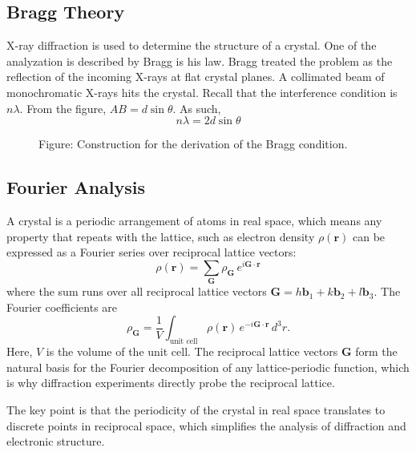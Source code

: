 \documentclass[../../../main.tex]{subfiles}
\begin{document}
\subsection{Bragg Theory}
X-ray diffraction is used to determine the structure of a crystal.
One of the analyzation is described by Bragg is his law.
Bragg treated the problem as the reflection of the incoming X-rays at flat crystal planes.
A collimated beam of monochromatic X-rays hits the crystal.
Recall that the interference condition is $n\lambda$. From the figure, $AB=d\sin \theta$.
As such,
\begin{equation*}
    n\lambda=2d\sin\theta
\end{equation*}
\begin{figure}[]
    \centering
    \caption*{Figure: Construction for the derivation of the Bragg condition.}
\end{figure}

\subsection{Fourier Analysis}
A crystal is a periodic arrangement of atoms in real space, which means any property that repeats with the lattice, such as electron density $\rho(\mathbf{r})$ can be expressed as a Fourier series over reciprocal lattice vectors:
\begin{equation*}
    \rho(\mathbf{r}) = \sum_{\mathbf{G}} \rho_{\mathbf{G}} \, e^{i \mathbf{G} \cdot \mathbf{r}}
\end{equation*}
where the sum runs over all reciprocal lattice vectors $\mathbf{G} = h \mathbf{b}_1 + k \mathbf{b}_2 + l \mathbf{b}_3$.
The Fourier coefficients are
\begin{equation*}
    \rho_{\mathbf{G}} = \frac{1}{V} \int_{\text{unit cell}} \rho(\mathbf{r}) \, e^{-i \mathbf{G} \cdot \mathbf{r}} \, d^3 r.
\end{equation*}
Here, $V$ is the volume of the unit cell.
The reciprocal lattice vectors $\mathbf{G}$ form the natural basis for the Fourier decomposition of any lattice-periodic function, which is why diffraction experiments directly probe the reciprocal lattice.

The key point is that the periodicity of the crystal in real space translates to discrete points in reciprocal space, which simplifies the analysis of diffraction and electronic structure.
\end{document}
